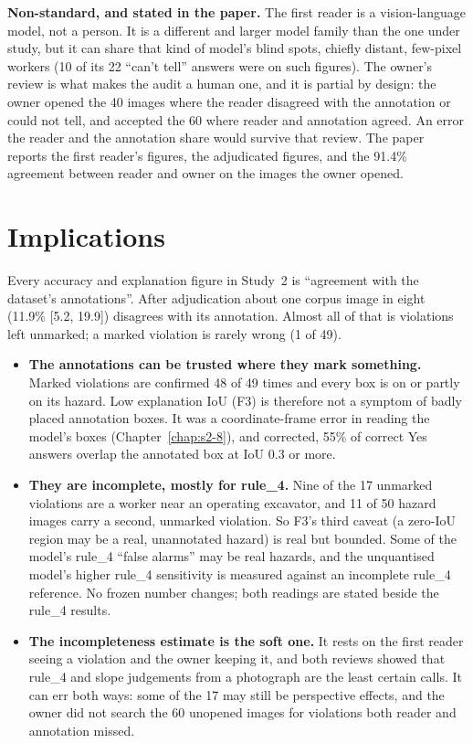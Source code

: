 \textbf{Non-standard, and stated in the paper.} The first reader is a vision-language model, not a person.
It is a different and larger model family than the one under study, but it can share that kind of model's
blind spots, chiefly distant, few-pixel workers (10 of its 22 ``can't tell'' answers were on such
figures). The owner's review is what makes the audit a human one, and it is partial by design: the owner
opened the 40 images where the reader disagreed with the annotation or could not tell, and accepted the 60
where reader and annotation agreed. An error the reader and the annotation share would survive that review.
The paper reports the first reader's figures, the adjudicated figures, and the 91.4\% agreement between
reader and owner on the images the owner opened.

\section{Implications}

Every accuracy and explanation figure in Study~2 is ``agreement with the dataset's annotations''. After
adjudication about one corpus image in eight (11.9\% [5.2, 19.9]) disagrees with its annotation. Almost
all of that is violations left unmarked; a marked violation is rarely wrong (1 of 49).
\begin{itemize}
\item \textbf{The annotations can be trusted where they mark something.} Marked violations are confirmed 48
of 49 times and every box is on or partly on its hazard. Low explanation IoU (F3) is therefore not a
symptom of badly placed annotation boxes. It was a coordinate-frame error in reading the model's boxes
(Chapter~\ref{chap:s2-8}), and corrected, 55\% of correct Yes answers overlap the annotated box at IoU
0.3 or more.
\item \textbf{They are incomplete, mostly for rule\_4.} Nine of the 17 unmarked violations are a worker near an
operating excavator, and 11 of 50 hazard images carry a second, unmarked violation. So F3's third caveat
(a zero-IoU region may be a real, unannotated hazard) is real but bounded. Some of the model's rule\_4
``false alarms'' may be real hazards, and the unquantised model's higher rule\_4 sensitivity is measured
against an incomplete rule\_4 reference. No frozen number changes; both readings are stated beside the
rule\_4 results.
\item \textbf{The incompleteness estimate is the soft one.} It rests on the first reader seeing a violation
and the owner keeping it, and both reviews showed that rule\_4 and slope judgements from a photograph are the
least certain calls. It can err both ways: some of the 17 may still be perspective effects, and the owner
did not search the 60 unopened images for violations both reader and annotation missed.
\end{itemize}
